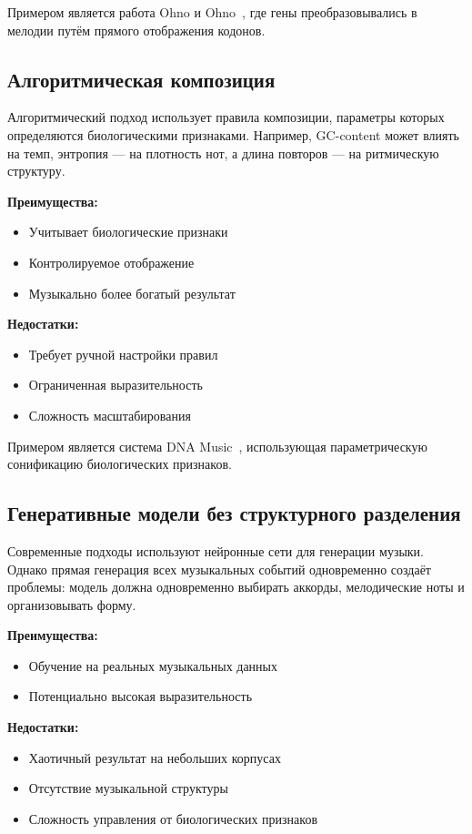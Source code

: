 Примером является работа Ohno и Ohno~\cite{ohno1986}, где гены преобразовывались в мелодии путём прямого отображения кодонов.

\subsection{Алгоритмическая композиция}

Алгоритмический подход использует правила композиции, параметры которых определяются биологическими признаками. Например, GC-content может влиять на темп, энтропия — на плотность нот, а длина повторов — на ритмическую структуру.

\textbf{Преимущества:}
\begin{itemize}
\item Учитывает биологические признаки
\item Контролируемое отображение
\item Музыкально более богатый результат
\end{itemize}

\textbf{Недостатки:}
\begin{itemize}
\item Требует ручной настройки правил
\item Ограниченная выразительность
\item Сложность масштабирования
\end{itemize}

Примером является система DNA Music~\cite{temple2017}, использующая параметрическую сонификацию биологических признаков.

\subsection{Генеративные модели без структурного разделения}

Современные подходы используют нейронные сети для генерации музыки. Однако прямая генерация всех музыкальных событий одновременно создаёт проблемы: модель должна одновременно выбирать аккорды, мелодические ноты и организовывать форму.

\textbf{Преимущества:}
\begin{itemize}
\item Обучение на реальных музыкальных данных
\item Потенциально высокая выразительность
\end{itemize}

\textbf{Недостатки:}
\begin{itemize}
\item Хаотичный результат на небольших корпусах
\item Отсутствие музыкальной структуры
\item Сложность управления от биологических признаков
\end{itemize}

